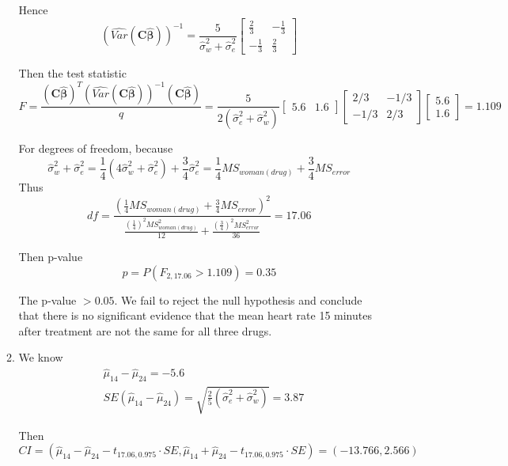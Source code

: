 \documentclass{article}
\begin{document}
\begin{enumerate}[leftmargin = 0 em, label = \arabic*., font = \bfseries]
\begin{enumerate}
		Hence 
		\[(\widehat{Var}(\bm C \hat{\bm \beta}))^{-1} = \frac{5}{\hat{\sigma}_w^2 + \hat{\sigma}_e^2} \begin{bmatrix}
			\frac{2}{3} & -\frac{1}{3}\\
			-\frac{1}{3} & \frac{2}{3}
 		\end{bmatrix}\]

 		Then the test statistic
 		\[F = \frac{(\bm C \hat{\bm \beta})^T (\widehat{Var}(\bm C \hat{\bm \beta}))^{-1}(\bm C \hat{\bm \beta})}{q} = \frac{5}{2 (\hat{\sigma}_e^2 + \hat{\sigma}_w^2)} \begin{bmatrix}
 			5.6 & 1.6
 		\end{bmatrix} \begin{bmatrix}
 			2/3 & -1/3\\
 			-1/3 & 2/3
 		\end{bmatrix} \begin{bmatrix}
 			5.6 \\ 1.6
 		\end{bmatrix} = 1.109\]

 		For degrees of freedom, because
 		\[\hat{\sigma}_w^2 + \hat{\sigma}_e^2 = \frac{1}{4} (4 \hat{\sigma}_w^2 + \hat{\sigma}_e^2) + \frac{3}{4} \hat{\sigma}_e^2 = \frac{1}{4} MS_{woman(drug)} + \frac{3}{4} MS_{error}\]
 		Thus
 		\[df = \frac{(\frac{1}{4} MS_{woman(drug)} + \frac{3}{4} MS_{error})^2}{\frac{(\frac{1}{4})^2 MS_{woman(drug)}^2}{12} + \frac{(\frac{3}{4})^2 MS_{error}^2}{36}} = 17.06\]

 		Then p-value
 		\[p = P(F_{2, 17.06} > 1.109) = 0.35\]

 		The p-value $ > 0.05$. We fail to reject the null hypothesis and conclude that there is no significant evidence that the mean heart rate 15 minutes after treatment are not the same for all three drugs.

 		\item 
 		We know
 		\begin{align*}
 		&\hat{\mu}_{14} - \hat{\mu}_{24} = -5.6\\
 		& SE(\hat{\mu}_{14} - \hat{\mu}_{24}) = \sqrt{\frac{2}{5} (\hat{\sigma}_e^2 + \hat{\sigma}_w^2)} = 3.87
 		\end{align*}

 		Then
 		\[CI = \left( \hat{\mu}_{14} - \hat{\mu}_{24} - t_{17.06, 0.975} \cdot SE ,  \hat{\mu}_{14} + \hat{\mu}_{24} - t_{17.06, 0.975} \cdot SE \right) = (-13.766, 2.566)\]
 		
		
	\end{enumerate}


\end{enumerate}
\end{document}
